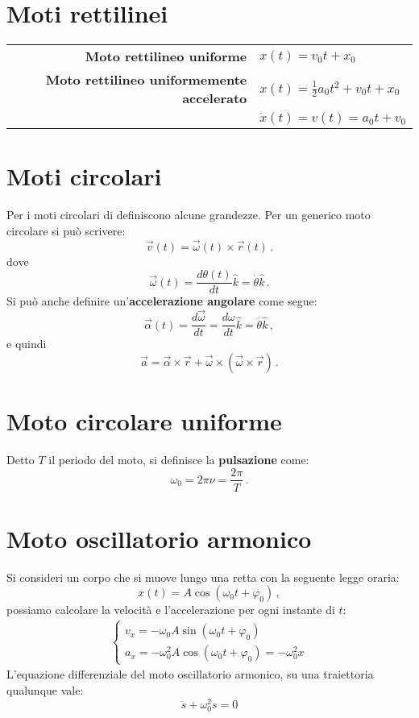 \documentclass[12pt]{book}
\begin{document}
\section{Moti rettilinei}
\begin{center}
\begin{tabular}{r l}
\textbf{Moto rettilineo uniforme} & $x(t)=v_0 t+x_0$\\[12pt]
\textbf{Moto rettilineo uniformemente accelerato} & $x(t)=\frac{1}{2}a_0 t^2 + v_0 t +x_0$\\
& $\dot{x}(t)=v(t)=a_0 t + v_0$\\
\end{tabular}
\end{center}

\section{Moti circolari}
Per i moti circolari di definiscono alcune grandezze. Per un generico moto circolare si può scrivere:
\[\vec{v}(t)=\vec{\omega}(t)\times\vec{r}(t)\,.\]
dove
\[\vec{\omega}(t)=\frac{d\theta (t)}{dt}\hat{k}=\dot{\theta}\hat{k}\,.\]
Si può anche definire un'\textbf{accelerazione angolare} come segue:
\[\vec{\alpha}(t)=\frac{d\vec{\omega}}{dt}=\frac{d\omega}{dt}\hat{k}=\ddot{\theta}\hat{k}\,,\]
e quindi
\[\vec{a}=\vec{\alpha}\times\vec{r}+\vec{\omega}\times(\vec{\omega}\times\vec{r})\,.\]
\bigskip
\section{Moto circolare uniforme}
Detto $T$ il periodo del moto, si definisce la \textbf{pulsazione} come:
\[\omega_0=2\pi\nu=\dfrac{2\pi}{T}\,.\]
\section{Moto oscillatorio armonico}
Si consideri un corpo che si muove lungo una retta con la seguente legge oraria:
\[x(t)=A\cos(\omega_0 t+\varphi_0)\,,\]
possiamo calcolare la velocità e l'accelerazione per ogni instante di $t$:
\begin{align*}
\begin{cases}
v_x=-\omega_0 A \sin(\omega_0 t + \varphi_0)\\
a_x=-\omega_0^2 A \cos(\omega_0 t + \varphi_0)=-\omega_0^2x
\end{cases}
\end{align*}
L'equazione differenziale del moto oscillatorio armonico, su una traiettoria qualunque vale:
\[\ddot{s}+\omega_0^2s=0\]
\end{document}

